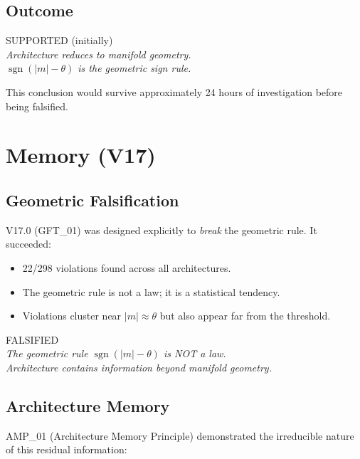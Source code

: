 \documentclass[11pt,a4paper,oneside]{report}
\newcommand{\supported}{\textcolor{supported}{SUPPORTED}}
\newcommand{\falsified}{\textcolor{falsified}{FALSIFIED}}
\DeclareMathOperator{\sgn}{sgn}
\begin{document}
\subsection{Outcome}

\begin{center}
\supported{} (initially)\\[4pt]
\textit{Architecture reduces to manifold geometry.}\\[2pt]
\textit{$\sgn(|m| - \theta)$ is the geometric sign rule.}
\end{center}

This conclusion would survive approximately 24 hours of investigation before
being falsified.

\section{Memory (V17)}\label{sec:memory}

\subsection{Geometric Falsification}

V17.0 (GFT\_01) was designed explicitly to \textit{break} the geometric rule.
It succeeded:

\begin{itemize}[nosep]
  \item 22/298 violations found across all architectures.
  \item The geometric rule is not a law; it is a statistical tendency.
  \item Violations cluster near $|m| \approx \theta$ but also appear far from
    the threshold.
\end{itemize}

\begin{center}
\falsified{}\\[4pt]
\textit{The geometric rule $\sgn(|m| - \theta)$ is NOT a law.}\\[2pt]
\textit{Architecture contains information beyond manifold geometry.}
\end{center}

\subsection{Architecture Memory}

AMP\_01 (Architecture Memory Principle) demonstrated the irreducible nature
of this residual information:
\end{document}
